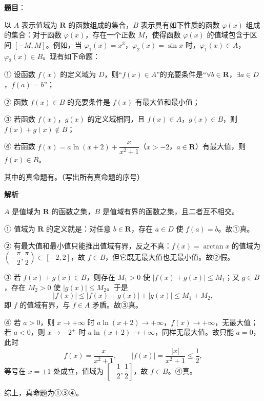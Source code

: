 \begin{answer}

\textbf{题目}：

以 $A$ 表示值域为 $\mathbf R$ 的函数组成的集合，$B$ 表示具有如下性质的函数 $\varphi(x)$ 组成的集合：对于函数 $\varphi(x)$，存在一个正数 $M$，使得函数 $\varphi(x)$ 的值域包含于区间 $[-M,M]$。例如，当 $\varphi_1(x)=x^3$，$\varphi_2(x)=\sin x$ 时，$\varphi_1(x)\in A$，$\varphi_2(x)\in B$。现有如下命题：

① 设函数 $f(x)$ 的定义域为 $D$，则“$f(x)\in A$”的充要条件是“$\forall b\in\mathbf R$，$\exists a\in D$，$f(a)=b$”；

② 函数 $f(x)\in B$ 的充要条件是 $f(x)$ 有最大值和最小值；

③ 若函数 $f(x)$，$g(x)$ 的定义域相同，且 $f(x)\in A$，$g(x)\in B$，则 $f(x)+g(x)\notin B$；

④ 若函数 $f(x)=a\ln(x+2)+\dfrac{x}{x^2+1}$（$x>-2$，$a\in\mathbf R$）有最大值，则 $f(x)\in B$。

其中的真命题有\gkblank{}。（写出所有真命题的序号）

\textbf{解析}

$A$ 是值域为 $\mathbf R$ 的函数之集，$B$ 是值域有界的函数之集，且二者互不相交。

① 值域为 $\mathbf R$ 的定义就是：对任意 $b\in\mathbf R$，存在 $a\in D$ 使 $f(a)=b$。故①真。

② 有最大值和最小值只能推出值域有界，反之不真：$f(x)=\arctan x$ 的值域为 $\left(-\dfrac\pi2,\dfrac\pi2\right)\subset[-2,2]$，故 $f\in B$，但它既无最大值也无最小值。故②假。

③ 若 $f(x)+g(x)\in B$，则存在 $M_1>0$ 使 $|f(x)+g(x)|\leqslant M_1$；又 $g\in B$，存在 $M_2>0$ 使 $|g(x)|\leqslant M_2$。于是
\nopagebreak[4]
\[|f(x)|\leqslant|f(x)+g(x)|+|g(x)|\leqslant M_1+M_2,\]
即 $f$ 的值域有界，与 $f\in A$ 矛盾。故③真。

④ 若 $a>0$，则 $x\to+\infty$ 时 $a\ln(x+2)\to+\infty$，$f(x)\to+\infty$，无最大值；若 $a<0$，则 $x\to-2^+$ 时 $a\ln(x+2)\to+\infty$，同样无最大值。故只能 $a=0$，此时
\nopagebreak[4]
\[f(x)=\frac{x}{x^2+1},\qquad |f(x)|=\frac{|x|}{x^2+1}\leqslant\frac12 ,\]
等号在 $x=\pm1$ 处成立，值域为 $\left[-\dfrac12,\dfrac12\right]$，故 $f\in B$。④真。

综上，真命题为①③④。


\end{answer}
